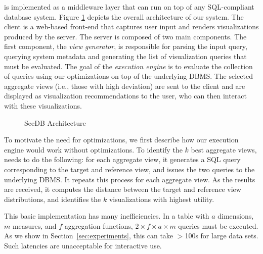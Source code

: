 \SeeDB is implemented as a middleware layer that can run on
top of any SQL-compliant database system. 
Figure \ref{fig:sys-arch} depicts the overall architecture of our
system.  The \SeeDB client is a web-based front-end that captures user
input and renders visualizations produced by the \SeeDB server.  The
\SeeDB server is composed of two main components. The first
component, the {\it view generator}, is responsible for parsing the
input query, querying system metadata and generating the list of
visualization queries that must be evaluated.  
The goal of the {\em execution engine} is to evaluate the collection of queries
 using our optimizations on top of
the underlying DBMS.
The selected aggregate views (i.e., those with high deviation) 
are sent to the \SeeDB client 
and are displayed as visualization recommendations to the user, 
who can then interact with these
visualizations.

\begin{figure}[htb]
\vspace{-5pt}
\centerline{
\hbox{}}
\vspace{-12pt}
\caption{SeeDB Architecture}
\vspace{-10pt}
\label{fig:sys-arch}
\end{figure} 

To motivate the need for optimizations, we first describe 
how our execution engine would work without optimizations. 
To identify the $k$ best aggregate views,
\SeeDB needs to do the following:
for each aggregate view, it generates
a SQL query corresponding to the target
and reference view, and issues
the two queries to the underlying DBMS.
It repeats this process for each aggregate view.
As the results are received, it computes the
distance between the target and reference view
distributions, and identifies the $k$ visualizations
with highest utility. 

This basic implementation has many inefficiencies.
In a table with $a$ dimensions, $m$ measures, and $f$ aggregation functions, 
$2\times f \times a \times  m$ queries must be executed.  
As we show in Section~\ref{sec:experiments}, this can take $>$100s for
 large data sets.
Such latencies are unacceptable for interactive use.

